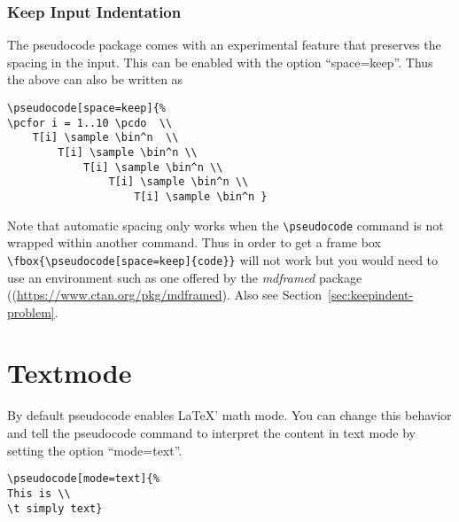 \documentclass[a4paper]{report}
\begin{document}
\subsubsection{Keep Input Indentation}
\label{sec:keepindent}
The pseudocode package comes with an experimental feature that preserves the spacing in the input. This can be enabled with
the option \enquote{space=keep}. Thus the above can also be written as
\begin{center}
\end{center}
\begin{lstlisting}
\pseudocode[space=keep]{%
\pcfor i = 1..10 \pcdo  \\
    T[i] \sample \bin^n  \\
        T[i] \sample \bin^n \\
            T[i] \sample \bin^n \\
                T[i] \sample \bin^n \\
                    T[i] \sample \bin^n }
\end{lstlisting}
Note that automatic spacing only works when the \lstinline$\pseudocode$ command is not wrapped within another command.
Thus in order to get a frame box \lstinline$\fbox{\pseudocode[space=keep]{code}}$ will not work but you would need to use
an environment such as one offered by the \emph{mdframed} package ((\url{https://www.ctan.org/pkg/mdframed}). Also see
Section~\ref{sec:keepindent-problem}.


\section{Textmode}

By default pseudocode enables \LaTeX' math mode. You can change this behavior and tell the pseudocode command to interpret the content
in text mode by setting the option \enquote{mode=text}.
\begin{center}
\end{center}
\begin{lstlisting}
\pseudocode[mode=text]{%
This is \\
\t simply text}
\end{lstlisting}
\end{document}
